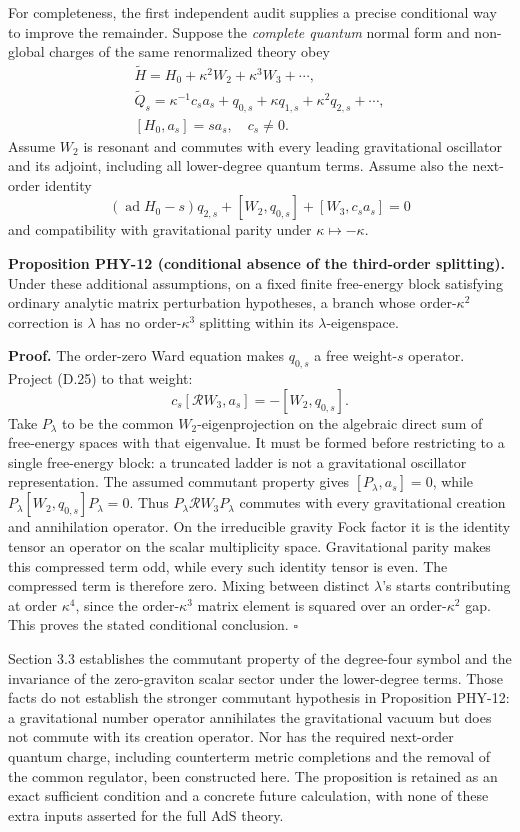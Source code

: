 For completeness, the first independent audit supplies a precise conditional way to improve the remainder. Suppose the \emph{complete quantum} normal form and non-global charges of the same renormalized theory obey \[
\begin{gathered}
\widetilde H=H_0+\kappa^2W_2+\kappa^3W_3+\cdots,\\
\widetilde Q_s=\kappa^{-1}c_sa_s+q_{0,s}+\kappa q_{1,s}
+\kappa^2q_{2,s}+\cdots,\\
[H_0,a_s]=sa_s,\quad c_s\ne0 .
\end{gathered}
\tag{D.24}
\] Assume \(W_2\) is resonant and commutes with every leading gravitational oscillator and its adjoint, including all lower-degree quantum terms. Assume also the next-order identity \[
(\operatorname{ad}H_0-s)q_{2,s}
+[W_2,q_{0,s}]+[W_3,c_sa_s]=0
\tag{D.25}
\] and compatibility with gravitational parity under \(\kappa\mapsto-\kappa\).

\textbf{Proposition PHY-12 (conditional absence of the third-order splitting).} Under these additional assumptions, on a fixed finite free-energy block satisfying ordinary analytic matrix perturbation hypotheses, a branch whose order-\(\kappa^2\) correction is \(\lambda\) has no order-\(\kappa^3\) splitting within its \(\lambda\)-eigenspace.

\textbf{Proof.} The order-zero Ward equation makes \(q_{0,s}\) a free weight-\(s\) operator. Project (D.25) to that weight: \[
c_s[\mathcal RW_3,a_s]=-[W_2,q_{0,s}].
\tag{D.26}
\] Take \(P_\lambda\) to be the common \(W_2\)-eigenprojection on the algebraic direct sum of free-energy spaces with that eigenvalue. It must be formed before restricting to a single free-energy block: a truncated ladder is not a gravitational oscillator representation. The assumed commutant property gives \([P_\lambda,a_s]=0\), while \(P_\lambda[W_2,q_{0,s}]P_\lambda=0\). Thus \(P_\lambda\mathcal RW_3P_\lambda\) commutes with every gravitational creation and annihilation operator. On the irreducible gravity Fock factor it is the identity tensor an operator on the scalar multiplicity space. Gravitational parity makes this compressed term odd, while every such identity tensor is even. The compressed term is therefore zero. Mixing between distinct \(\lambda\)'s starts contributing at order \(\kappa^4\), since the order-\(\kappa^3\) matrix element is squared over an order-\(\kappa^2\) gap. This proves the stated conditional conclusion. \(\square\)

Section 3.3 establishes the commutant property of the degree-four symbol and the invariance of the zero-graviton scalar sector under the lower-degree terms. Those facts do not establish the stronger commutant hypothesis in Proposition PHY-12: a gravitational number operator annihilates the gravitational vacuum but does not commute with its creation operator. Nor has the required next-order quantum charge, including counterterm metric completions and the removal of the common regulator, been constructed here. The proposition is retained as an exact sufficient condition and a concrete future calculation, with none of these extra inputs asserted for the full AdS theory.

